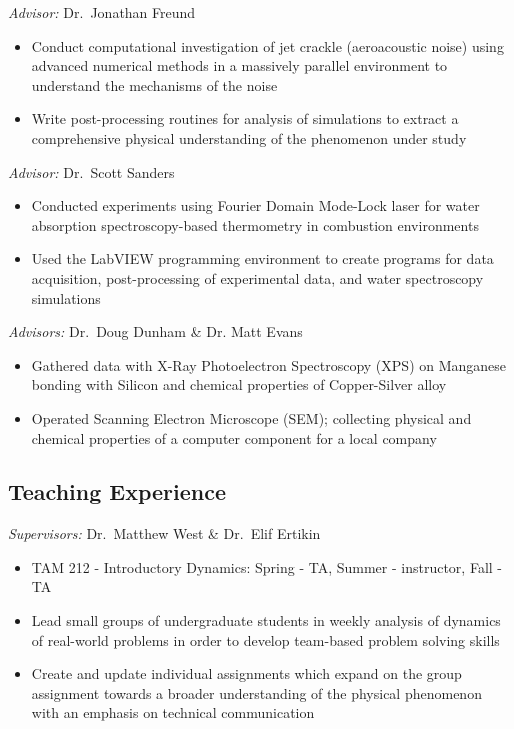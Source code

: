 \documentclass[11pt,letter,sans]{moderncv}
\begin{document}
%
  {\textit{Advisor:} Dr.\ Jonathan Freund
  \begin{itemize}
  	\item Conduct computational investigation of jet crackle (aeroacoustic noise) using advanced numerical methods in a massively parallel environment to understand the mechanisms of the noise
	\item Write post-processing routines for analysis of simulations to extract a comprehensive physical understanding of the phenomenon under study
  \end{itemize}
  }

%
  {\textit{Advisor:} Dr.\ Scott Sanders
  \begin{itemize}
  	\item Conducted experiments using Fourier Domain Mode-Lock laser for water absorption spectroscopy-based thermometry in combustion environments
	\item Used the LabVIEW programming environment to create programs for data acquisition, post-processing of experimental data, and water spectroscopy simulations
  \end{itemize}
  }

%
  {\textit{Advisors:} Dr.\ Doug Dunham \& Dr. Matt Evans
  \begin{itemize}
  	\item Gathered data with X-Ray Photoelectron Spectroscopy (XPS) on Manganese bonding with Silicon and chemical properties of Copper-Silver alloy
	\item Operated Scanning Electron Microscope (SEM); collecting physical and chemical properties of a computer component for a local company
  \end{itemize}
  }

\pagebreak

\subsection{Teaching Experience}

%
  {\textit{Supervisors:} Dr.\ Matthew West \& Dr.\ Elif Ertikin
  \begin{itemize}
	\item TAM 212 - Introductory Dynamics: Spring - TA, Summer - instructor, Fall - TA
  	\item Lead small groups of undergraduate students in weekly analysis of dynamics of real-world problems in order to develop team-based problem solving skills
	\item  Create and update individual assignments which expand on the group assignment towards a broader understanding of the physical phenomenon with an emphasis on technical communication
  \end{itemize}
  }
\end{document}
